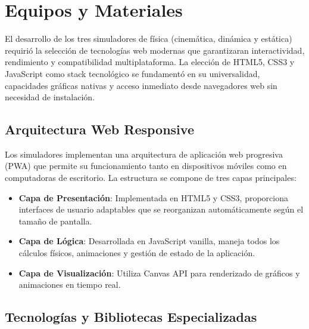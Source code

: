 \section{Equipos y Materiales}

El desarrollo de los tres simuladores de física (cinemática, dinámica y estática) requirió la selección de tecnologías web modernas que garantizaran interactividad, rendimiento y compatibilidad multiplataforma. La elección de HTML5, CSS3 y JavaScript como stack tecnológico se fundamentó en su universalidad, capacidades gráficas nativas y acceso inmediato desde navegadores web sin necesidad de instalación.

\subsection{Arquitectura Web Responsive}

Los simuladores implementan una arquitectura de aplicación web progresiva (PWA) que permite su funcionamiento tanto en dispositivos móviles como en computadoras de escritorio. La estructura se compone de tres capas principales:

\begin{itemize}
    \item \textbf{Capa de Presentación}: Implementada en HTML5 y CSS3, proporciona interfaces de usuario adaptables que se reorganizan automáticamente según el tamaño de pantalla.
    
    \item \textbf{Capa de Lógica}: Desarrollada en JavaScript vanilla, maneja todos los cálculos físicos, animaciones y gestión de estado de la aplicación.
    
    \item \textbf{Capa de Visualización}: Utiliza Canvas API para renderizado de gráficos y animaciones en tiempo real.
\end{itemize}

\subsection{Tecnologías y Bibliotecas Especializadas}

